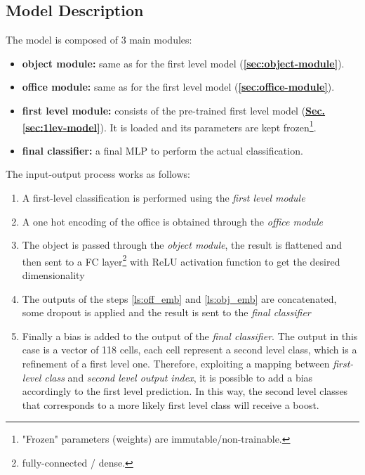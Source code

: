 \documentclass[12pt]{article}
\begin{document}
\subsection{Model Description}\label{sec:sec-lvl-desc}
The model is composed of 3 main modules:
\begin{itemize}
    \item \textbf{object module:} same as for the first level model (\hyperref[sec:object-module]{\textbf{\ref{sec:object-module}}}).
    \item \textbf{office module:} same as for the first level model (\hyperref[sec:office-module]{\textbf{\ref{sec:office-module}}}).
    \item \textbf{first level module:} consists of the pre-trained first level model (\hyperref[sec:1lev-model]{\textbf{Sec. \ref{sec:1lev-model}}}). It is loaded and its parameters are kept frozen\footnote{\label{ftnote:frozen} "Frozen" parameters (weights) are immutable/non-trainable.}.
    \item \textbf{final classifier:} a final MLP to perform the actual classification.
\end{itemize}
The input-output process works as follows:
\begin{enumerate}
    \item \label{ls:1lev_cls} A first-level classification is performed using the \textit{first level module}
    \item \label{ls:off_emb} A one hot encoding of the office is obtained through the \textit{office module}
    \item \label{ls:obj_emb} The object is passed through the \textit{object module}, the result is flattened and then sent to a FC layer\footnote{\label{ftnote:fc_layer} fully-connected / dense.} with ReLU activation function to get the desired dimensionality
    \item \label{ls:concat} The outputs of the steps \ref{ls:off_emb} and \ref{ls:obj_emb} are concatenated, some dropout is applied and the result is sent to the \textit{final classifier}
    \item \label{ls:final} Finally a bias is added to the output of the \textit{final classifier}. The output in this case is a vector of 118 cells, each cell represent a second level class, which is a refinement of a first level one. Therefore, exploiting a mapping between \textit{first-level class} and \textit{second level output index}, it is possible to add a bias accordingly to the first level prediction. In this way, the second level classes that corresponds to a more likely first level class will receive a boost.
\end{enumerate}
\end{document}
